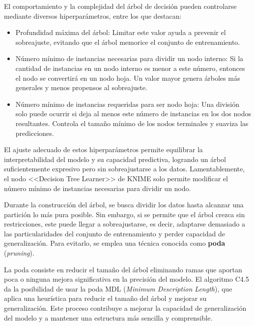 \begin{enumerate}
    El comportamiento y la complejidad del árbol de decisión pueden controlarse mediante diversos hiperparámetros, entre los que destacan:

    \begin{itemize}

        \item Profundidad máxima del árbol: Limitar este valor ayuda a prevenir el sobreajuste, evitando que el árbol memorice el conjunto de entrenamiento.
        
        \item Número mínimo de instancias necesarias para dividir un nodo interno: Si la cantidad de instancias en un nodo interno es menor a este número, entonces el nodo se convertirá en un nodo hoja. Un valor mayor genera árboles más generales y menos propensos al sobreajuste.
        
        \item Número mínimo de instancias requeridas para ser nodo hoja: Una división solo puede ocurrir si deja al menos este número de instancias en los dos nodos resultantes.
        Controla el tamaño mínimo de los nodos terminales y suaviza las predicciones.
        
    \end{itemize}

    El ajuste adecuado de estos hiperparámetros permite equilibrar la interpretabilidad del modelo y su capacidad predictiva, logrando un árbol suficientemente expresivo pero sin sobreajustarse a los datos. Lamentablemente, el nodo <<Decision Tree Learner>> de KNIME solo permite modificar el número mínimo de instancias necesarias para dividir un nodo. 

    Durante la construcción del árbol, se busca dividir los datos hasta alcanzar una partición lo más pura posible. Sin embargo, si se permite que el árbol crezca sin restricciones, este puede llegar a sobreajustarse, es decir, adaptarse demasiado a las particularidades del conjunto de entrenamiento y perder capacidad de generalización. Para evitarlo, se emplea una técnica conocida como \textbf{poda} (\textit{pruning}).

    La poda consiste en reducir el tamaño del árbol eliminando ramas que aportan poca o ninguna mejora significativa en la precisión del modelo. El algoritmo C4.5 da la posibilidad de usar la poda MDL (\textit{Minimum Description Length}), que aplica una heurística para reducir el tamaño del árbol y mejorar su generalización. Este proceso contribuye a mejorar la capacidad de generalización del modelo y a mantener una estructura más sencilla y comprensible.


\end{enumerate}
